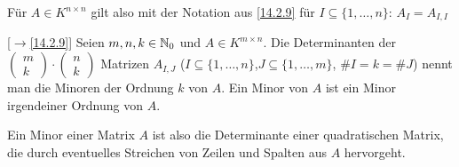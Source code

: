 \documentclass[../../main.tex]{subfiles}
\begin{document}
\begin{bem}\label{17.2.2}
    Für $A\in K^{n\times n}$ gilt also mit der Notation aus \ref{14.2.9} für $I\subseteq\{1,\ldots ,n\}$: $A_I=A_{I,I}$
\end{bem}

\begin{df}\mbox{}[$\to$\ref{14.2.9}]\label{17.2.3}
    Seien $m,n,k\in \mathbb N_0$ und $A\in K^{m\times n}$. Die Determinanten der $\begin{pmatrix*}m\\k\end{pmatrix*}\cdot\begin{pmatrix*}n\\k\end{pmatrix*}$ Matrizen $A_{I,J}$ ($I\subseteq\{1,\ldots ,n\}$,$J\subseteq\{1,\ldots ,m\}$, $\# I=k=\# J$) nennt man die Minoren der Ordnung $k$ von $A$. Ein Minor von  $A$ ist ein Minor irgendeiner Ordnung von $A$.
\end{df}

\begin{bem}\label{17.2.4}
    Ein Minor einer Matrix $A$ ist also die Determinante einer quadratischen Matrix, die durch eventuelles Streichen von Zeilen und Spalten aus $A$ hervorgeht.
\end{bem}
\end{document}

